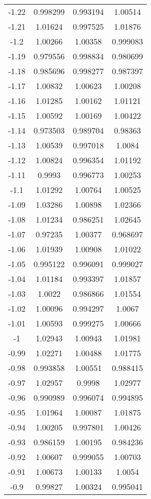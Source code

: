\begin{table}[h!]
\begin{tabular}{|c|c|c|c|}
-1.22 & 0.998299 & 0.993194 & 1.00514 \\
-1.21 & 1.01624 & 0.997525 & 1.01876 \\
-1.2 & 1.00266 & 1.00358 & 0.999083 \\
-1.19 & 0.979556 & 0.998834 & 0.980699 \\
-1.18 & 0.985696 & 0.998277 & 0.987397 \\
-1.17 & 1.00832 & 1.00623 & 1.00208 \\
-1.16 & 1.01285 & 1.00162 & 1.01121 \\
-1.15 & 1.00592 & 1.00169 & 1.00422 \\
-1.14 & 0.973503 & 0.989704 & 0.98363 \\
-1.13 & 1.00539 & 0.997018 & 1.0084 \\
-1.12 & 1.00824 & 0.996354 & 1.01192 \\
-1.11 & 0.9993 & 0.996773 & 1.00253 \\
-1.1 & 1.01292 & 1.00764 & 1.00525 \\
-1.09 & 1.03286 & 1.00898 & 1.02366 \\
-1.08 & 1.01234 & 0.986251 & 1.02645 \\
-1.07 & 0.97235 & 1.00377 & 0.968697 \\
-1.06 & 1.01939 & 1.00908 & 1.01022 \\
-1.05 & 0.995122 & 0.996091 & 0.999027 \\
-1.04 & 1.01184 & 0.993397 & 1.01857 \\
-1.03 & 1.0022 & 0.986866 & 1.01554 \\
-1.02 & 1.00096 & 0.994297 & 1.0067 \\
-1.01 & 1.00593 & 0.999275 & 1.00666 \\
-1 & 1.02943 & 1.00943 & 1.01981 \\
-0.99 & 1.02271 & 1.00488 & 1.01775 \\
-0.98 & 0.993858 & 1.00551 & 0.988415 \\
-0.97 & 1.02957 & 0.9998 & 1.02977 \\
-0.96 & 0.990989 & 0.996074 & 0.994895 \\
-0.95 & 1.01964 & 1.00087 & 1.01875 \\
-0.94 & 1.00205 & 0.997801 & 1.00426 \\
-0.93 & 0.986159 & 1.00195 & 0.984236 \\
-0.92 & 1.00607 & 0.999055 & 1.00703 \\
-0.91 & 1.00673 & 1.00133 & 1.0054 \\
-0.9 & 0.99827 & 1.00324 & 0.995041 \\

\end{tabular}
\end{table}
